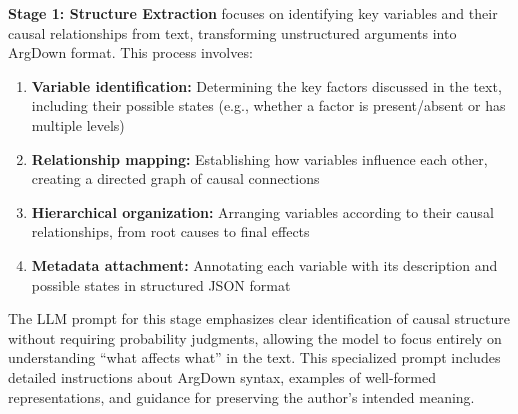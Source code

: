 \documentclass[
  11pt,
  letterpaper,
]{book}
\begin{document}
\textbf{Stage 1: Structure Extraction} focuses on identifying key
variables and their causal relationships from text, transforming
unstructured arguments into ArgDown format. This process involves:

\begin{enumerate}
\def\labelenumi{\arabic{enumi}.}
\item
  \textbf{Variable identification:} Determining the key factors
  discussed in the text, including their possible states (e.g., whether
  a factor is present/absent or has multiple levels)
\item
  \textbf{Relationship mapping:} Establishing how variables influence
  each other, creating a directed graph of causal connections
\item
  \textbf{Hierarchical organization:} Arranging variables according to
  their causal relationships, from root causes to final effects
\item
  \textbf{Metadata attachment:} Annotating each variable with its
  description and possible states in structured JSON format
\end{enumerate}

The LLM prompt for this stage emphasizes clear identification of causal
structure without requiring probability judgments, allowing the model to
focus entirely on understanding ``what affects what'' in the text. This
specialized prompt includes detailed instructions about ArgDown syntax,
examples of well-formed representations, and guidance for preserving the
author's intended meaning.
\end{document}
